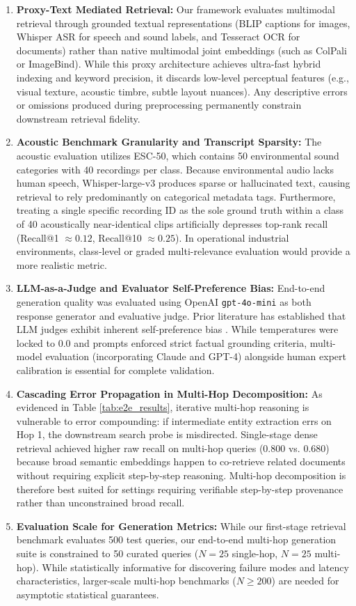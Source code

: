 \documentclass[conference]{IEEEtran}
\begin{document}
\begin{enumerate}
    \item \textbf{Proxy-Text Mediated Retrieval:} Our framework evaluates multimodal retrieval through grounded textual representations (BLIP captions for images, Whisper ASR for speech and sound labels, and Tesseract OCR for documents) rather than native multimodal joint embeddings (such as ColPali or ImageBind). While this proxy architecture achieves ultra-fast hybrid indexing and keyword precision, it discards low-level perceptual features (e.g., visual texture, acoustic timbre, subtle layout nuances). Any descriptive errors or omissions produced during preprocessing permanently constrain downstream retrieval fidelity.
    \item \textbf{Acoustic Benchmark Granularity and Transcript Sparsity:} The acoustic evaluation utilizes ESC-50, which contains 50 environmental sound categories with 40 recordings per class. Because environmental audio lacks human speech, Whisper-large-v3 produces sparse or hallucinated text, causing retrieval to rely predominantly on categorical metadata tags. Furthermore, treating a single specific recording ID as the sole ground truth within a class of 40 acoustically near-identical clips artificially depresses top-rank recall (Recall@1 $\approx 0.12$, Recall@10 $\approx 0.25$). In operational industrial environments, class-level or graded multi-relevance evaluation would provide a more realistic metric.
    \item \textbf{LLM-as-a-Judge and Evaluator Self-Preference Bias:} End-to-end generation quality was evaluated using OpenAI \texttt{gpt-4o-mini} as both response generator and evaluative judge. Prior literature has established that LLM judges exhibit inherent self-preference bias \cite{zheng2023judging}. While temperatures were locked to 0.0 and prompts enforced strict factual grounding criteria, multi-model evaluation (incorporating Claude and GPT-4) alongside human expert calibration is essential for complete validation.
    \item \textbf{Cascading Error Propagation in Multi-Hop Decomposition:} As evidenced in Table \ref{tab:e2e_results}, iterative multi-hop reasoning is vulnerable to error compounding: if intermediate entity extraction errs on Hop 1, the downstream search probe is misdirected. Single-stage dense retrieval achieved higher raw recall on multi-hop queries (0.800 vs. 0.680) because broad semantic embeddings happen to co-retrieve related documents without requiring explicit step-by-step reasoning. Multi-hop decomposition is therefore best suited for settings requiring verifiable step-by-step provenance rather than unconstrained broad recall.
    \item \textbf{Evaluation Scale for Generation Metrics:} While our first-stage retrieval benchmark evaluates 500 test queries, our end-to-end multi-hop generation suite is constrained to 50 curated queries ($N=25$ single-hop, $N=25$ multi-hop). While statistically informative for discovering failure modes and latency characteristics, larger-scale multi-hop benchmarks ($N \ge 200$) are needed for asymptotic statistical guarantees.
\end{enumerate}
\end{document}
